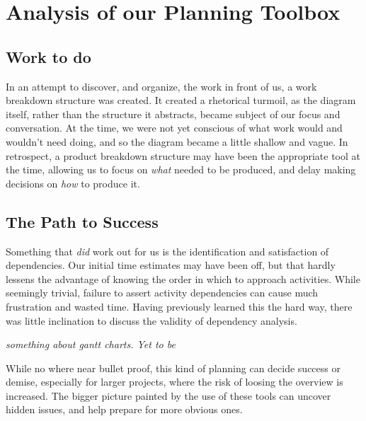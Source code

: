 \section{Analysis of our Planning Toolbox}
\subsection{Work to do}
In an attempt to discover, and organize, the work in front of us, a work
breakdown structure was created. It created a rhetorical turmoil, as the diagram
itself, rather than the structure it abstracts, became subject of our focus and
conversation. At the time, we were not yet conscious of what work would
and wouldn't need doing, and so the diagram became a little shallow and vague.
In retrospect, a product breakdown structure may have been the appropriate tool
at the time, allowing us to focus on \emph{what} needed to be produced, and delay
making decisions on \emph{how} to produce it\cite{caye}.

\subsection{The Path to Success}
Something that \emph{did} work out for us is the identification and satisfaction of
dependencies. Our initial time estimates may have been off, but that hardly
lessens the advantage of knowing the order in which to approach activities.
While seemingly trivial, failure to assert activity dependencies can cause much
frustration and wasted time. Having previously learned this the hard way, there
was little inclination to discuss the validity of dependency analysis.

\emph{something about gantt charts. Yet to be}

While no where near bullet proof, this kind of planning can decide success or
demise\cite[chpt.~8]{caye}, especially for larger projects, where the risk of
loosing the overview is increased. The bigger picture painted by the use of
these tools can uncover hidden issues, and help prepare for more obvious ones.
